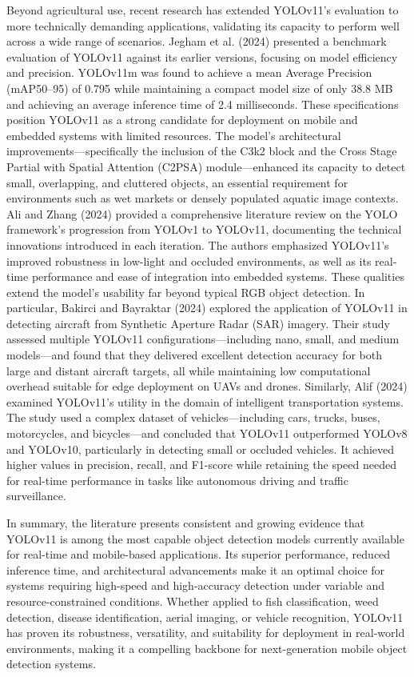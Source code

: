Beyond agricultural use, recent research has extended YOLOv11's evaluation to more technically demanding applications, validating its capacity to perform well across a wide range of scenarios. Jegham et al. (2024) presented a benchmark evaluation of YOLOv11 against its earlier versions, focusing on model efficiency and precision. YOLOv11m was found to achieve a mean Average Precision (mAP50–95) of 0.795 while maintaining a compact model size of only 38.8 MB and achieving an average inference time of 2.4 milliseconds. These specifications position YOLOv11 as a strong candidate for deployment on mobile and embedded systems with limited resources. The model’s architectural improvements—specifically the inclusion of the C3k2 block and the Cross Stage Partial with Spatial Attention (C2PSA) module—enhanced its capacity to detect small, overlapping, and cluttered objects, an essential requirement for environments such as wet markets or densely populated aquatic image contexts. Ali and Zhang (2024) provided a comprehensive literature review on the YOLO framework’s progression from YOLOv1 to YOLOv11, documenting the technical innovations introduced in each iteration. The authors emphasized YOLOv11's improved robustness in low-light and occluded environments, as well as its real-time performance and ease of integration into embedded systems. These qualities extend the model’s usability far beyond typical RGB object detection. In particular, Bakirci and Bayraktar (2024) explored the application of YOLOv11 in detecting aircraft from Synthetic Aperture Radar (SAR) imagery. Their study assessed multiple YOLOv11 configurations—including nano, small, and medium models—and found that they delivered excellent detection accuracy for both large and distant aircraft targets, all while maintaining low computational overhead suitable for edge deployment on UAVs and drones. Similarly, Alif (2024) examined YOLOv11’s utility in the domain of intelligent transportation systems. The study used a complex dataset of vehicles—including cars, trucks, buses, motorcycles, and bicycles—and concluded that YOLOv11 outperformed YOLOv8 and YOLOv10, particularly in detecting small or occluded vehicles. It achieved higher values in precision, recall, and F1-score while retaining the speed needed for real-time performance in tasks like autonomous driving and traffic surveillance.

In summary, the literature presents consistent and growing evidence that YOLOv11 is among the most capable object detection models currently available for real-time and mobile-based applications. Its superior performance, reduced inference time, and architectural advancements make it an optimal choice for systems requiring high-speed and high-accuracy detection under variable and resource-constrained conditions. Whether applied to fish classification, weed detection, disease identification, aerial imaging, or vehicle recognition, YOLOv11 has proven its robustness, versatility, and suitability for deployment in real-world environments, making it a compelling backbone for next-generation mobile object detection systems.



